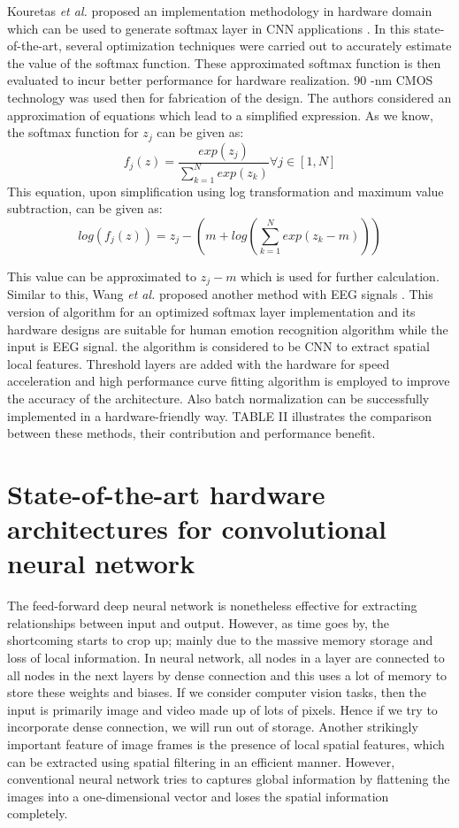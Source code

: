 \documentclass[journal]{IEEEtran}
\begin{document}
\par Kouretas \textit{et al.} proposed an implementation methodology in hardware domain which can be used to generate softmax layer in CNN applications \cite{paper18}. In this state-of-the-art, several optimization techniques were carried out to accurately estimate the value of the softmax function. These approximated softmax function is then evaluated to incur better performance for hardware realization. 90 -nm CMOS technology was used then for fabrication of the design. The authors considered an approximation of equations which lead to a simplified expression. As we know, the softmax function for $z_{j}$ can be given as:
\begin{equation}
    f_{j}(z) = \frac{exp(z_{j})}{\sum _{k = 1}^{N}exp(z_{k})} \forall j \in [1,N]
\end{equation}
This equation, upon simplification using log transformation and maximum value subtraction, can be given as:
\begin{equation}
    log(f_{j}(z)) = z_{j} - (m + log(\sum _{k = 1}^{N}exp(z_{k}-m)))
\end{equation}




This value can be approximated to $z_{j} - m$ which is used for further calculation. Similar to this, Wang \textit{et al.} proposed another method with EEG signals \cite{paper19}. This version of algorithm for an optimized softmax layer implementation and its hardware designs are suitable for human emotion recognition algorithm while the input is EEG signal. the algorithm is considered to be CNN to extract spatial local features. Threshold layers are added with the hardware for speed acceleration and high performance curve fitting algorithm is employed to improve the accuracy of the architecture. Also batch normalization can be successfully implemented in a hardware-friendly way. TABLE II illustrates the comparison between these methods, their contribution and performance benefit.

\section{State-of-the-art hardware architectures for convolutional neural network}
The feed-forward deep neural network is nonetheless effective for extracting relationships between input and output. However, as time goes by, the shortcoming starts to crop up; mainly due to the massive memory storage and loss of local information. In neural network, all nodes in a layer are connected to all nodes in the next layers by dense connection and this uses a lot of memory to store these weights and biases. If we consider computer vision tasks, then the input is primarily image and video made up of lots of pixels. Hence if we try to incorporate dense connection, we will run out of storage. Another strikingly important feature of image frames is the presence of local spatial features, which can be extracted using spatial filtering in an efficient manner. However, conventional neural network tries to captures global information by flattening the images into a one-dimensional vector and loses the spatial information completely.
\end{document}
